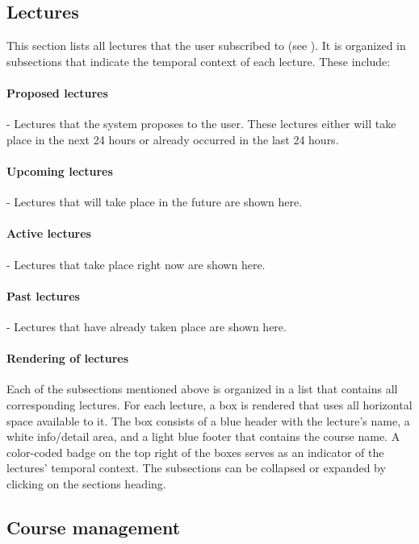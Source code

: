 \subsection{Lectures}
\label{section:soa:mainview:lectures}
This section lists all lectures that the user subscribed to (see ). It is organized in subsections that indicate the temporal context of each lecture. These include:

\paragraph{Proposed lectures} - Lectures that the system proposes to the user. These lectures either will take place in the next 24 hours or already occurred in the last 24 hours.
\paragraph{Upcoming lectures} - Lectures that will take place in the future are shown here.
\paragraph{Active lectures} - Lectures that take place right now are shown here.
\paragraph{Past lectures} - Lectures that have already taken place are shown here.

\paragraph{Rendering of lectures}

Each of the subsections mentioned above is organized in a list that contains all corresponding lectures. For each lecture, a box is rendered that uses all horizontal space available to it. The box consists of a blue header with the lecture's name, a white info/detail area, and a light blue footer that contains the course name.
A color-coded badge on the top right of the boxes serves as an indicator of the lectures' temporal context.
The subsections can be collapsed or expanded by clicking on the sections heading.



\subsection{Course management}

